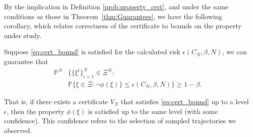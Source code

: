 By the implication in Definition \ref{prob:property_cert}, and under the same conditions as those in Theorem~\ref{thm:Guarantees}, we have the following corollary, which relates correctness of the certificate to bounds on the property under study. 
\begin{cor}\label{corr:prop}
Suppose \eqref{eq:cert_bound} is satisfied for the calculated risk $\epsilon(C_N,\beta,N)$, we can guarantee that 
\begin{equation}
    \begin{aligned}
	\mathbb{P}^N&\big\{\{\xi^i\}_{i=1}^N\in \Xi^N\colon\\&\mathbb{P}\{\xi \in \Xi \colon \neg \phi(\xi)\} \leq \epsilon(C_N,\beta,N)\} \geq 1-\beta. \label{eq:prop_viol}
\end{aligned}
\end{equation}
\end{cor}
That is, if there exists a certificate $V_N$ that satisfies \eqref{eq:cert_bound} up to a level $\epsilon$, then the property $\phi(\xi)$ is satisfied up to the same level (with some confidence). This confidence refers to the selection of sampled trajectories we observed.


